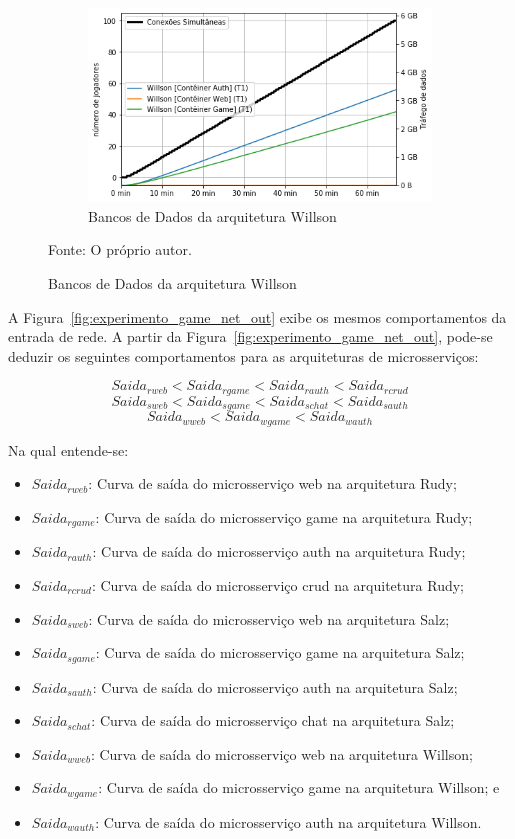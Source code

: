 \begin{figure}[htb!]
    \begin{subfigure}{0.5\textwidth}
        \centering
        \includegraphics[width=.95\linewidth]{figuras/analise/rt/w_net_out_arch.png}
        \caption{Bancos de Dados da arquitetura Willson}
        \label{fig:w_netout_arch}
    \end{subfigure}

    Fonte: O próprio autor.
\end{figure}

A Figura~\ref{fig:experimento_game_net_out} exibe os mesmos comportamentos da entrada de rede.
%
A partir da Figura~\ref{fig:experimento_game_net_out}, pode-se deduzir os seguintes comportamentos para as arquiteturas de microsserviços:

$$
     Saida_{rweb} < Saida_{rgame} < Saida_{rauth} < Saida_{rcrud}
$$
$$
     Saida_{sweb} < Saida_{sgame} < Saida_{schat} < Saida_{sauth}
$$
$$
     Saida_{wweb} < Saida_{wgame} < Saida_{wauth}
$$

Na qual entende-se:

\begin{itemize}
 \item $Saida_{rweb}$: Curva de saída do microsserviço web na arquitetura Rudy;
 \item $Saida_{rgame}$: Curva de saída do microsserviço game na arquitetura Rudy;
 \item $Saida_{rauth}$: Curva de saída do microsserviço auth na arquitetura Rudy;
 \item $Saida_{rcrud}$: Curva de saída do microsserviço crud na arquitetura Rudy;
  \item $Saida_{sweb}$: Curva de saída do microsserviço web na arquitetura Salz;
 \item $Saida_{sgame}$: Curva de saída do microsserviço game na arquitetura Salz;
 \item $Saida_{sauth}$: Curva de saída do microsserviço auth na arquitetura Salz;
 \item $Saida_{schat}$: Curva de saída do microsserviço chat na arquitetura Salz;
 \item $Saida_{wweb}$: Curva de saída do microsserviço web na arquitetura Willson;
 \item $Saida_{wgame}$: Curva de saída do microsserviço game na arquitetura Willson; e
 \item $Saida_{wauth}$: Curva de saída do microsserviço auth na arquitetura Willson.
\end{itemize}

